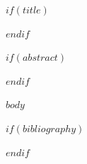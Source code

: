 \documentclass[11pt,a4paper]{article}
\theoremstyle{definition}
\theoremstyle{remark}
\begin{document}
$if(title)$\maketitle$endif$

$if(abstract)$
\begin{abstract}
$abstract$
\end{abstract}
$endif$

$body$

$if(bibliography)$


$endif$
\end{document}
